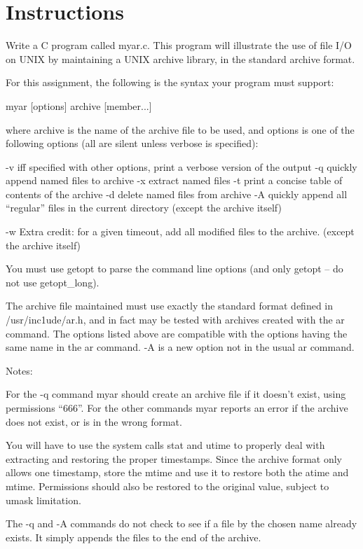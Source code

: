 \documentclass[letterpaper,10pt]{article}
\begin{document}
\newpage

\section*{Instructions}
Write a C program called myar.c. This program will illustrate the use of file
I/O on UNIX by maintaining a UNIX archive library, in the standard archive
format.

For this assignment, the following is the syntax your program must support:

myar [options] archive [member...]

where archive is the name of the archive file to be used, and options is one of
the following options (all are silent unless verbose is specified):

-v  iff specified with other options, print a verbose version of the output
-q  quickly append named files to archive    
-x  extract named files      
-t  print a concise table of contents of the archive     
-d  delete named files from archive      
-A  quickly append all ``regular'' files in the current directory   (except the
    archive itself)

-w  Extra credit: for a given timeout, add all modified files to the archive.
    (except the archive itself)

You must use getopt to parse the command line options (and only getopt -- do
not use getopt_long).

The archive file maintained must use exactly the standard format defined in
/usr/inc1ude/ar.h, and in fact may be tested with archives created with the ar
command. The options listed above are compatible with the options having the
same name in the ar command. -A is a new option not in the usual ar command.

Notes:

    For the -q command myar should create an archive file if it doesn't exist,
    using permissions ``666''. For the other commands myar reports an error if
    the archive does not exist, or is in the wrong format.

    You will have to use the system calls stat and utime to properly deal with
    extracting and restoring the proper timestamps. Since the archive format
    only allows one timestamp, store the mtime and use it to restore both the
    atime and mtime. Permissions should also be restored to the original value,
    subject to umask limitation.

    The -q and -A commands do not check to see if a file by the chosen name
    already exists. It simply appends the files to the end of the archive.
\end{document}
